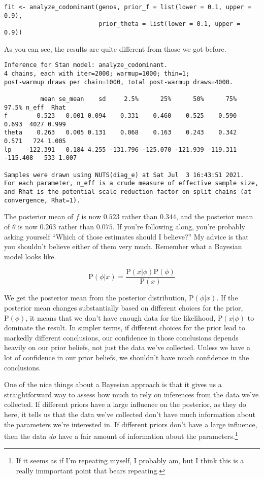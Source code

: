 \begin{verbatim}
fit <- analyze_codominant(genos, prior_f = list(lower = 0.1, upper = 0.9), 
                          prior_theta = list(lower = 0.1, upper = 0.9))
\end{verbatim}
As you can see, the results are quite different from those we got
before.

{\small
\begin{verbatim}
Inference for Stan model: analyze_codominant.
4 chains, each with iter=2000; warmup=1000; thin=1; 
post-warmup draws per chain=1000, total post-warmup draws=4000.

          mean se_mean    sd     2.5%      25%      50%      75%    97.5% n_eff  Rhat
f        0.523   0.001 0.094    0.331    0.460    0.525    0.590    0.693  4027 0.999
theta    0.263   0.005 0.131    0.068    0.163    0.243    0.342    0.571   724 1.005
lp__  -122.391   0.184 4.255 -131.796 -125.070 -121.939 -119.311 -115.408   533 1.007

Samples were drawn using NUTS(diag_e) at Sat Jul  3 16:43:51 2021.
For each parameter, n_eff is a crude measure of effective sample size,
and Rhat is the potential scale reduction factor on split chains (at 
convergence, Rhat=1).
\end{verbatim}
}

The posterior mean of $f$ is now $0.523$ rather than $0.344$, and the
posterior mean of $\theta$ is now $0.263$ rather than $0.075$. If
you're following along, you're probably asking yourself ``Which of
those estimates should I believe?'' My advice is that you shouldn't
believe either of them very much. Remember what a Bayesian model looks
like.

$$
\mbox{P}(\phi|x) = \frac{\mbox{P}(x|\phi)\mbox{P}(\phi)}{\mbox{P}(x)}
$$

\noindent We get the posterior mean from the posterior distribution,
$\mbox{P}(\phi|x)$. If the posterior mean changes substantially based
on different choices for the prior, $\mbox{P}(\phi)$, it means that we
don't have enough data for the likelihood, $\mbox{P}(x|\phi)$ to
dominate the result. In simpler terms, if different choices for the
prior lead to markedly different conclusions, our confidence in those
conclusions depends heavily on our prior beliefs, not just the data
we've collected. Unless we have a lot of confidence in our prior
beliefs, we shouldn't have much confidence in the conclusions.

One of the nice things about a Bayesian approach is that it gives us a
straightforward way to assess how much to rely on inferences from the
data we've collected. If different priors have a large influence on
the posterior, as they do here, it tells us that the data we've
collected don't have much information about the parameters we're
interested in. If different priors don't have a large influence, then
the data {\it do\/} have a fair amount of information about the
parameters.\footnote{If it seems as if I'm repeating myself, I
  probably am, but I think this is a really immportant point that
  bears repeating.} 

